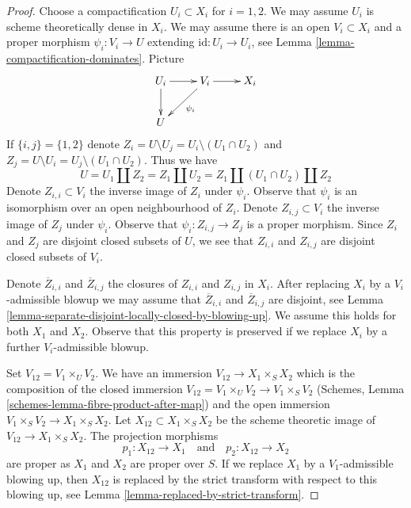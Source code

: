 \documentclass[10pt,a4paper]{amsart}
\theoremstyle{plain}
\theoremstyle{definition}
\theoremstyle{remark}
\numberwithin{equation}{subsection}
\begin{document}
\begin{proof}
Choose a compactification $U_i \subset X_i$ for $i = 1, 2$. We may
assume $U_i$ is scheme theoretically dense in $X_i$. We may assume there
is an open $V_i \subset X_i$ and a proper morphism
$\psi_i : V_i \to U$ extending $\text{id} : U_i \to U_i$, see
Lemma \ref{lemma-compactification-dominates}. Picture
$$
\xymatrix{
U_i \ar[r] \ar[d] & V_i \ar[r] \ar[dl]^{\psi_i} & X_i \\
U
}
$$
If $\{i, j\} = \{1, 2\}$ denote
$Z_i = U \setminus U_j = U_i \setminus (U_1 \cap U_2)$
and
$Z_j = U \setminus U_i = U_j \setminus (U_1 \cap U_2)$.
Thus we have
$$
U = U_1 \amalg Z_2 = Z_1 \amalg U_2 = Z_1 \amalg (U_1 \cap U_2) \amalg Z_2
$$
Denote $Z_{i, i} \subset V_i$ the inverse image of $Z_i$ under $\psi_i$.
Observe that $\psi_i$ is an isomorphism over an open neighbourhood of $Z_i$.
Denote $Z_{i, j} \subset V_i$ the inverse image of $Z_j$ under $\psi_i$.
Observe that $\psi_i : Z_{i, j} \to Z_j$ is a proper morphism.
Since $Z_i$ and $Z_j$ are disjoint closed subsets of
$U$, we see that $Z_{i, i}$ and $Z_{i, j}$ are disjoint closed subsets
of $V_i$.

\medskip\noindent
Denote $\overline{Z}_{i, i}$ and $\overline{Z}_{i, j}$ the closures of
$Z_{i, i}$ and $Z_{i, j}$ in $X_i$. After replacing $X_i$ by a
$V_i$-admissible blowup we may assume that
$\overline{Z}_{i, i}$ and $\overline{Z}_{i, j}$ are disjoint, see
Lemma \ref{lemma-separate-disjoint-locally-closed-by-blowing-up}.
We assume this holds for both $X_1$ and $X_2$.
Observe that this property is preserved if we replace $X_i$
by a further $V_i$-admissible blowup.

\medskip\noindent
Set $V_{12} = V_1 \times_U V_2$. We have an immersion
$V_{12} \to X_1 \times_S X_2$ which is the composition of the closed
immersion $V_{12} = V_1 \times_U V_2 \to V_1 \times_S V_2$
(Schemes, Lemma \ref{schemes-lemma-fibre-product-after-map})
and the open immersion $V_1 \times_S V_2 \to X_1 \times_S X_2$.
Let $X_{12} \subset X_1 \times_S X_2$ be the scheme theoretic
image of $V_{12} \to X_1 \times_S X_2$. The projection morphisms
$$
p_1 : X_{12} \to X_1
\quad\text{and}\quad
p_2 : X_{12} \to X_2
$$
are proper as $X_1$ and $X_2$ are proper over $S$. If we replace $X_1$ by a
$V_1$-admissible blowing up, then $X_{12}$ is replaced by
the strict transform with respect to this blowing up, see
Lemma \ref{lemma-replaced-by-strict-transform}.


\end{proof}
\end{document}
